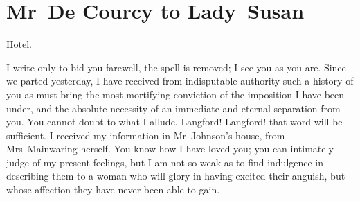 \chapter{Mr~De Courcy to Lady~Susan}
  
  \vfill
  \begin{mail}{\doubleemdash  Hotel.}{}

I write only to bid you farewell, the spell is removed; I see you as you are. Since we parted yesterday, I have received from indisputable authority such a history of you as must bring the most mortifying conviction of the imposition I have been under, and the absolute necessity of an immediate and eternal separation from you. You cannot doubt to what I allude. Langford! Langford! that word will be sufficient. I received my information in Mr~Johnson's house, from Mrs~Mainwaring herself. You know how I have loved you; you can intimately judge of my present feelings, but I am not so weak as to find indulgence in describing them to a woman who will glory in having excited their anguish, but whose affection they have never been able to gain. 

\end{mail}

\vfill
